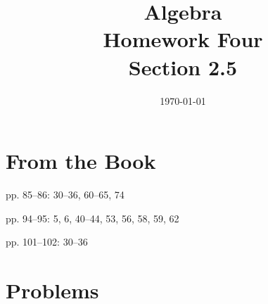 \documentclass[letterpaper]{exam}
\title{Algebra \\ Homework Four \\ Section 2.5}
\author{}
\date{\today}
\begin{document}
  \maketitle

  \section{From the Book}

  \begin{itemize*}
    \item pp. 85--86: 30--36, 60--65, 74
    \item pp. 94--95: 5, 6, 40--44, 53, 56, 58, 59, 62
    \item pp. 101--102: 30--36
  \end{itemize*}

  \section{Problems}
\end{document}
